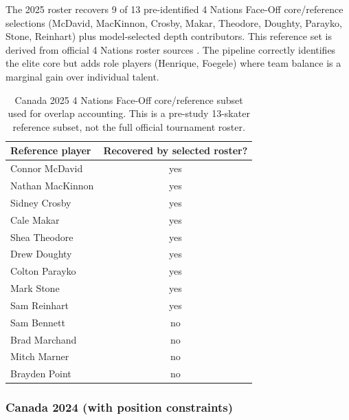 \documentclass[12pt,letterpaper]{article}
\begin{document}
The 2025 roster recovers 9 of 13 pre-identified 4 Nations Face-Off
core/reference selections
(McDavid, MacKinnon, Crosby, Makar, Theodore, Doughty, Parayko, Stone,
Reinhart) plus model-selected depth contributors.
This reference set is derived from official 4 Nations roster sources
\citep{hockeyCanada4Nations,nhlFourNationsRosters}.
The pipeline correctly identifies the elite core but adds role players
(Henrique, Foegele) where team balance is a marginal gain over
individual talent.

\begin{table}[h]
  \centering
  \caption{Canada 2025 4 Nations Face-Off core/reference subset used
    for overlap accounting. This is a pre-study 13-skater reference
    subset, not the full official tournament roster.}
  \label{tab:canada2025ref}
  \small
  \begin{tabular}{l c}
    \toprule
    Reference player & Recovered by selected roster? \\
    \midrule
    Connor McDavid   & yes \\
    Nathan MacKinnon & yes \\
    Sidney Crosby    & yes \\
    Cale Makar       & yes \\
    Shea Theodore    & yes \\
    Drew Doughty     & yes \\
    Colton Parayko   & yes \\
    Mark Stone       & yes \\
    Sam Reinhart     & yes \\
    Sam Bennett      & no  \\
    Brad Marchand    & no  \\
    Mitch Marner     & no  \\
    Brayden Point    & no  \\
    \bottomrule
  \end{tabular}
\end{table}

\subsubsection{Canada 2024 (with position constraints)}
\end{document}
